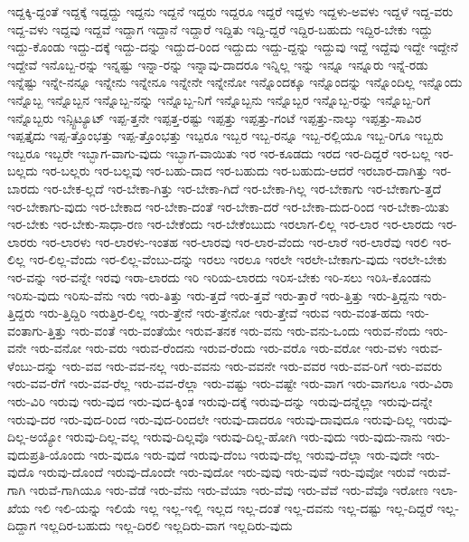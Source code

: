 {ಇದ್ದಕ್ಕಿ-ದ್ದಂತೆ
ಇದ್ದಕ್ಕೆ
ಇದ್ದದ್ದು
ಇದ್ದನು
ಇದ್ದನೆ
ಇದ್ದರು
ಇದ್ದರೂ
ಇದ್ದರೆ
ಇದ್ದಳು
ಇದ್ದಳು-ಅವಳು
ಇದ್ದಳೆ
ಇದ್ದ-ವರು
ಇದ್ದ-ವಳು
ಇದ್ದವು
ಇದ್ದವೆ
ಇದ್ದಾಗ
ಇದ್ದಾನೆ
ಇದ್ದಾರೆ
ಇದ್ದಿತು
ಇದ್ದಿ-ದ್ದರೆ
ಇದ್ದಿರ-ಬಹುದು
ಇದ್ದಿರ-ಬೇಕು
ಇದ್ದು
ಇದ್ದು-ಕೊಂಡು
ಇದ್ದು-ದಕ್ಕೆ
ಇದ್ದು-ದನ್ನು
ಇದ್ದುದ-ರಿಂದ
ಇದ್ದುದು
ಇದ್ದು-ದ್ದನ್ನು
ಇದ್ದುವು
ಇದ್ದೆ
ಇದ್ದೆವು
ಇದ್ದೇ
ಇದ್ದೇನೆ
ಇದ್ದೇವೆ
ಇನೊಬ್ಬ-ರನ್ನು
ಇನ್ನಷ್ಟು
ಇನ್ನಾ-ರನ್ನು
ಇನ್ನಾವು-ದಾದರೂ
ಇನ್ನಿಲ್ಲ
ಇನ್ನು
ಇನ್ನೂ
ಇನ್ನೂರು
ಇನ್ನೆ-ರಡು
ಇನ್ನೆಷ್ಟು
ಇನ್ನೇ-ನನ್ನೂ
ಇನ್ನೇನು
ಇನ್ನೇನೂ
ಇನ್ನೇನೇ
ಇನ್ನೇನೋ
ಇನ್ನೊಂದಕ್ಕೂ
ಇನ್ನೊಂದನ್ನು
ಇನ್ನೊಂದಿಲ್ಲ
ಇನ್ನೊಂದು
ಇನ್ನೊಬ್ಬ
ಇನ್ನೊಬ್ಬನ
ಇನ್ನೊಬ್ಬ-ನನ್ನು
ಇನ್ನೊಬ್ಬ-ನಿಗೆ
ಇನ್ನೊಬ್ಬನು
ಇನ್ನೊಬ್ಬರ
ಇನ್ನೊಬ್ಬ-ರನ್ನು
ಇನ್ನೊಬ್ಬ-ರಿಗೆ
ಇನ್ನೊಬ್ಬರು
ಇನ್ಸ್ಟಿಟ್ಯೂಟ್
ಇಪ್ಪ-ತ್ತನೇ
ಇಪ್ಪತ್ತ-ರಷ್ಟು
ಇಪ್ಪತ್ತು
ಇಪ್ಪತ್ತು-ಗಂಟೆ
ಇಪ್ಪತ್ತು-ನಾಲ್ಕು
ಇಪ್ಪತ್ತು-ಸಾವಿರ
ಇಪ್ಪತ್ತೈದು
ಇಪ್ಪ-ತ್ತೊಂಭತ್ತು
ಇಪ್ಪ-ತ್ತೊಂಭತ್ತು
ಇಬ್ಪರೂ
ಇಬ್ಬರ
ಇಬ್ಬ-ರನ್ನೂ
ಇಬ್ಬ-ರಲ್ಲಿಯೂ
ಇಬ್ಬ-ರಿಗೂ
ಇಬ್ಬರು
ಇಬ್ಬರೂ
ಇಬ್ಬರೇ
ಇಬ್ಭಾಗ-ವಾಗು-ವುದು
ಇಬ್ಭಾಗ-ವಾಯಿತು
ಇರ
ಇರ-ಕೂಡದು
ಇರದ
ಇರ-ದಿದ್ದರೆ
ಇರ-ಬಲ್ಲ
ಇರ-ಬಲ್ಲದು
ಇರ-ಬಲ್ಲರು
ಇರ-ಬಲ್ಲವು
ಇರ-ಬಹು-ದಾದ
ಇರ-ಬಹುದು
ಇರ-ಬಹುದು-ಆದರೆ
ಇರಬಾರ-ದಾಗಿತ್ತು
ಇರ-ಬಾರದು
ಇರ-ಬೇಕ-ಲ್ಲದೆ
ಇರ-ಬೇಕಾ-ಗಿತ್ತು
ಇರ-ಬೇಕಾ-ಗಿದೆ
ಇರ-ಬೇಕಾ-ಗಿಲ್ಲ
ಇರ-ಬೇಕಾಗು
ಇರ-ಬೇಕಾಗು-ತ್ತದೆ
ಇರ-ಬೇಕಾಗು-ವುದು
ಇರ-ಬೇಕಾದ
ಇರ-ಬೇಕಾ-ದಂತೆ
ಇರ-ಬೇಕಾ-ದರೆ
ಇರ-ಬೇಕಾ-ದುದ-ರಿಂದ
ಇರ-ಬೇಕಾ-ಯಿತು
ಇರ-ಬೇಕು
ಇರ-ಬೇಕು-ಸಾಧಾ-ರಣ
ಇರ-ಬೇಕೆಂದು
ಇರ-ಬೇಕೆಂಬುದು
ಇರಲಾಗ-ಲಿಲ್ಲ
ಇರ-ಲಾರ
ಇರ-ಲಾರದು
ಇರ-ಲಾರರು
ಇರ-ಲಾರಳು
ಇರ-ಲಾರಳು-ಇಂತಹ
ಇರ-ಲಾರವು
ಇರ-ಲಾರ-ವೆಂದು
ಇರ-ಲಾರೆ
ಇರ-ಲಾರೆವು
ಇರಲಿ
ಇರ-ಲಿಲ್ಲ
ಇರ-ಲಿಲ್ಲ-ವೆಂದು
ಇರ-ಲಿಲ್ಲ-ವೆಂಬು-ದನ್ನು
ಇರಲು
ಇರಲೂ
ಇರಲೇ
ಇರಲೇ-ಬೇಕಾಗು-ವುದು
ಇರಲೇ-ಬೇಕು
ಇರ-ವನ್ನು
ಇರ-ವನ್ನೇ
ಇರವು
ಇರಾ-ಲಾರದು
ಇರಿ
ಇರಿಯ-ಲಾರದು
ಇರಿಸ-ಬೇಕು
ಇರಿ-ಸಲು
ಇರಿಸಿ-ಕೊಂಡನು
ಇರಿಸು-ವುದು
ಇರಿಸು-ವೆನು
ಇರು
ಇರು-ತಿತ್ತು
ಇರು-ತ್ತದೆ
ಇರು-ತ್ತವೆ
ಇರು-ತ್ತಾರೆ
ಇರು-ತ್ತಿತ್ತು
ಇರು-ತ್ತಿದ್ದನು
ಇರು-ತ್ತಿದ್ದರು
ಇರು-ತ್ತಿದ್ದಿರಿ
ಇರುತ್ತಿರ-ಲಿಲ್ಲ
ಇರು-ತ್ತೇನೆ
ಇರು-ತ್ತೇನೋ
ಇರು-ತ್ತೇವೆ
ಇರುವ
ಇರು-ವಂತ-ಹದು
ಇರು-ವಂತಾಗು-ತ್ತಿತ್ತು
ಇರು-ವಂತೆ
ಇರು-ವಂತೆಯೇ
ಇರುವ-ತನಕ
ಇರು-ವನು
ಇರು-ವನು-ಒಂದು
ಇರುವ-ನೆಂದು
ಇರು-ವನೇ
ಇರು-ವನೋ
ಇರು-ವರು
ಇರುವ-ರೆಂದನು
ಇರುವ-ರೆಂದು
ಇರು-ವರೊ
ಇರು-ವರೋ
ಇರು-ವಳು
ಇರುವ-ಳೆಂಬು-ದನ್ನು
ಇರು-ವವ
ಇರು-ವವ-ನಲ್ಲ
ಇರು-ವವನು
ಇರು-ವವನೇ
ಇರು-ವವರ
ಇರು-ವವ-ರಿಗೆ
ಇರು-ವವರು
ಇರು-ವವ-ರೆಗೆ
ಇರು-ವವ-ರೆಲ್ಲ
ಇರು-ವವ-ರೆಲ್ಲಾ
ಇರು-ವಷ್ಟು
ಇರು-ವಷ್ಟೇ
ಇರು-ವಾಗ
ಇರು-ವಾಗಲೂ
ಇರು-ವಿರಾ
ಇರು-ವಿರಿ
ಇರುವು
ಇರು-ವುದ
ಇರು-ವುದ-ಕ್ಕಿಂತ
ಇರುವು-ದಕ್ಕೆ
ಇರುವು-ದನ್ನು
ಇರುವು-ದನ್ನೆಲ್ಲಾ
ಇರುವು-ದನ್ನೇ
ಇರುವು-ದರ
ಇರು-ವುದ-ರಿಂದ
ಇರು-ವುದ-ರಿಂದಲೇ
ಇರುವು-ದಾದರೂ
ಇರುವು-ದಾವುದೂ
ಇರುವು-ದಿಲ್ಲ
ಇರುವು-ದಿಲ್ಲ-ಅಯ್ಯೋ
ಇರುವು-ದಿಲ್ಲ-ವಲ್ಲ
ಇರುವು-ದಿಲ್ಲವೊ
ಇರುವು-ದಿಲ್ಲ-ಹೋಗಿ
ಇರು-ವುದು
ಇರು-ವುದು-ನಾನು
ಇರು-ವುದುಪ್ರತಿ-ಯೊಂದು
ಇರು-ವುದೂ
ಇರು-ವುದೆ
ಇರುವು-ದೆಂಬ
ಇರುವು-ದೆಲ್ಲ
ಇರುವು-ದೆಲ್ಲಾ
ಇರು-ವುದೇ
ಇರು-ವುದೊ
ಇರುವು-ದೊಂದೆ
ಇರುವು-ದೊಂದೇ
ಇರು-ವುದೋ
ಇರು-ವುವು
ಇರು-ವುವೆ
ಇರು-ವುವೋ
ಇರುವೆ
ಇರುವೆ-ಗಾಗಿ
ಇರುವೆ-ಗಾಗಿಯೂ
ಇರು-ವೆಡೆ
ಇರು-ವೆನು
ಇರು-ವೆಯಾ
ಇರು-ವೆವು
ಇರು-ವೆವೆ
ಇರು-ವೆವೊ
ಇರೋಣ
ಇಲಾ-ಖೆಯ
ಇಲಿ
ಇಲಿ-ಯನ್ನು
ಇಲಿಯೆ
ಇಲ್ಲ
ಇಲ್ಲ-ಇಲ್ಲಿ
ಇಲ್ಲದ
ಇಲ್ಲ-ದಂತೆ
ಇಲ್ಲ-ದವನು
ಇಲ್ಲ-ದಷ್ಟು
ಇಲ್ಲ-ದಿದ್ದರೆ
ಇಲ್ಲ-ದಿದ್ದಾಗ
ಇಲ್ಲದಿರ-ಬಹುದು
ಇಲ್ಲ-ದಿರಲಿ
ಇಲ್ಲದಿರು-ವಾಗ
ಇಲ್ಲದಿರು-ವುದು
}

